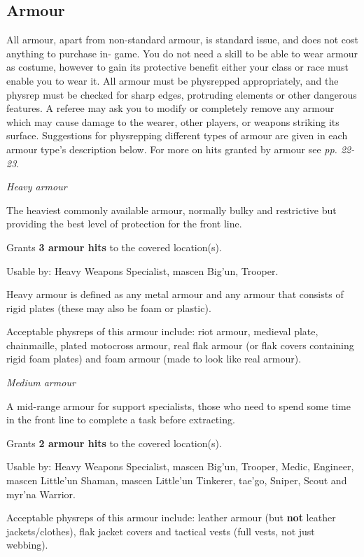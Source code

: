 \subsection{Armour}

All armour, apart from non-standard armour, is standard issue, and does not cost anything to purchase in- game. You do not need a skill to be able to wear armour as costume, however to gain its protective benefit either your class or race must enable you to wear it. All armour must be physrepped appropriately, and the physrep must be checked for sharp edges, protruding elements or other dangerous features. A referee may ask you to modify or completely remove any armour which may cause damage to the wearer, other players, or weapons striking its surface. Suggestions for physrepping different types of armour are given in each armour type's description below. For more on hits granted by armour see \textit{pp. 22-23}.

\textit{Heavy armour}

The heaviest commonly available armour, normally bulky and restrictive but providing the best level of protection for the front line.

Grants \textbf{3 armour hits} to the covered location(s).

Usable by: Heavy Weapons Specialist, mascen Big'un, Trooper.

Heavy armour is defined as any metal armour and any armour that consists of rigid plates (these may also be foam or plastic).

Acceptable physreps of this armour include: riot armour, medieval plate, chainmaille, plated motocross armour, real flak armour (or flak covers containing rigid foam plates) and foam armour (made to look like real armour).

\textit{Medium armour}

A mid-range armour for support specialists, those who need to spend some time in the front line to complete a task before extracting.

Grants \textbf{2 armour hits} to the covered location(s).

Usable by: Heavy Weapons Specialist, mascen Big'un, Trooper, Medic, Engineer, mascen Little'un Shaman, mascen Little'un Tinkerer, tae'go, Sniper, Scout and myr'na Warrior.

Acceptable physreps of this armour include: leather armour (but \textbf{not} leather jackets/clothes), flak jacket covers and tactical vests (full vests, not just webbing).

